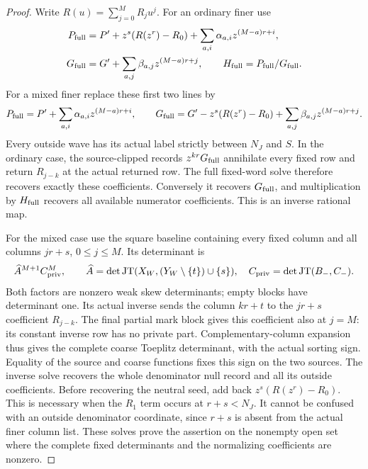 \documentclass[11pt,a4paper]{amsart}
\numberwithin{equation}{section}
\theoremstyle{plain}
\theoremstyle{definition}
\newcommand{\JT}{\operatorname{JT}}
\begin{document}
\begin{proof}
Write \(R(u)=\sum_{j=0}^MR_ju^j\).  For an ordinary finer use
\begin{equation}\label{ph:ordinary-source-chart}
 \begin{aligned}
 P_{\rm full}&=P'+z^s(R(z^r)-R_0)
       +\sum_{a,i}\alpha_{a,i}z^{(M-a)r+i},\\
 G_{\rm full}&=G'+\sum_{a,j}\beta_{a,j}z^{(M-a)r+j},
 \qquad H_{\rm full}=P_{\rm full}/G_{\rm full}.
 \end{aligned}
\end{equation}
For a mixed finer replace these first two lines by
\begin{equation}\label{ph:mixed-source-chart}
 P_{\rm full}=P'+\sum_{a,i}\alpha_{a,i}z^{(M-a)r+i},\qquad
 G_{\rm full}=G'-z^s(R(z^r)-R_0)
                  +\sum_{a,j}\beta_{a,j}z^{(M-a)r+j}.
\end{equation}
Every outside wave has its actual label strictly between \(N_J\) and
\(S\).  In the ordinary case, the source-clipped records
\(z^{kr}G_{\rm full}\) annihilate every fixed row and return
\(R_{j-k}\) at the actual returned row.  The full fixed-word solve
therefore recovers exactly these coefficients.  Conversely it recovers
\(G_{\rm full}\), and multiplication by \(H_{\rm full}\) recovers all
available numerator coefficients.  This is an inverse rational map.

For the mixed case use the square baseline containing every fixed column
and all columns \(jr+s\), \(0\le j\le M\).  Its determinant is
\begin{equation}\label{ph:mixed-baseline-det}
 \widehat A^{M+1}C_{\rm priv}^{M},\qquad
 \widehat A=\det\JT(X_W,(Y_W\setminus\{t\})\cup\{s\}),\quad
 C_{\rm priv}=\det\JT(B_-,C_-).
\end{equation}
Both factors are nonzero weak skew determinants; empty blocks have
determinant one.  Its actual inverse sends the column \(kr+t\) to the
\(jr+s\) coefficient \(R_{j-k}\).  The final partial mark block gives
this coefficient also at \(j=M\): its constant inverse row has no private
part.  Complementary-column expansion thus gives the complete coarse
Toeplitz determinant, with the actual sorting sign.  Equality of the
source and coarse functions fixes this sign on the two sources.
The inverse solve recovers the whole denominator null record and all its
outside coefficients.  Before recovering the neutral seed, add back
\(z^s(R(z^r)-R_0)\).  This is necessary when the \(R_1\) term occurs at
\(r+s<N_J\).  It cannot be confused with an outside denominator coordinate,
since \(r+s\) is absent from the actual finer column list.
These solves prove the assertion on the nonempty open set where the
complete fixed determinants and the normalizing coefficients are nonzero.
\end{proof}
\end{document}
